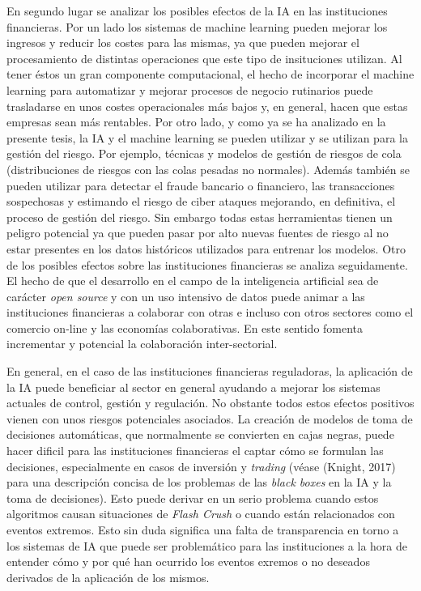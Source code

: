 \documentclass[]{DissertateUSU}
\begin{document}
\noindent En segundo lugar se analizar los posibles efectos de la IA en
las instituciones financieras. Por un lado los sistemas de machine
learning pueden mejorar los ingresos y reducir los costes para las
mismas, ya que pueden mejorar el procesamiento de distintas operaciones
que este tipo de insituciones utilizan. Al tener éstos un gran
componente computacional, el hecho de incorporar el machine learning
para automatizar y mejorar procesos de negocio rutinarios puede
trasladarse en unos costes operacionales más bajos y, en general, hacen
que estas empresas sean más rentables. Por otro lado, y como ya se ha
analizado en la presente tesis, la IA y el machine learning se pueden
utilizar y se utilizan para la gestión del riesgo. Por ejemplo, técnicas
y modelos de gestión de riesgos de cola (distribuciones de riesgos con
las colas pesadas no normales). Además también se pueden utilizar para
detectar el fraude bancario o financiero, las transacciones sospechosas
y estimando el riesgo de ciber ataques mejorando, en definitiva, el
proceso de gestión del riesgo. Sin embargo todas estas herramientas
tienen un peligro potencial ya que pueden pasar por alto nuevas fuentes
de riesgo al no estar presentes en los datos históricos utilizados para
entrenar los modelos. Otro de los posibles efectos sobre las
instituciones financieras se analiza seguidamente. El hecho de que el
desarrollo en el campo de la inteligencia artificial sea de carácter
\emph{open source} y con un uso intensivo de datos puede animar a las
instituciones financieras a colaborar con otras e incluso con otros
sectores como el comercio on-line y las economías colaborativas. En este
sentido fomenta incrementar y potencial la colaboración inter-sectorial.

\noindent En general, en el caso de las instituciones financieras
reguladoras, la aplicación de la IA puede beneficiar al sector en
general ayudando a mejorar los sistemas actuales de control, gestión y
regulación. No obstante todos estos efectos positivos vienen con unos
riesgos potenciales asociados. La creación de modelos de toma de
decisiones automáticas, que normalmente se convierten en cajas negras,
puede hacer dificil para las instituciones financieras el captar cómo se
formulan las decisiones, especialmente en casos de inversión y
\emph{trading} (véase (Knight, 2017) para una descripción concisa de los
problemas de las \emph{black boxes} en la IA y la toma de decisiones).
Esto puede derivar en un serio problema cuando estos algoritmos causan
situaciones de \emph{Flash Crush} o cuando están relacionados con
eventos extremos. Esto sin duda significa una falta de transparencia en
torno a los sistemas de IA que puede ser problemático para las
instituciones a la hora de entender cómo y por qué han ocurrido los
eventos exremos o no deseados derivados de la aplicación de los mismos.
\end{document}
